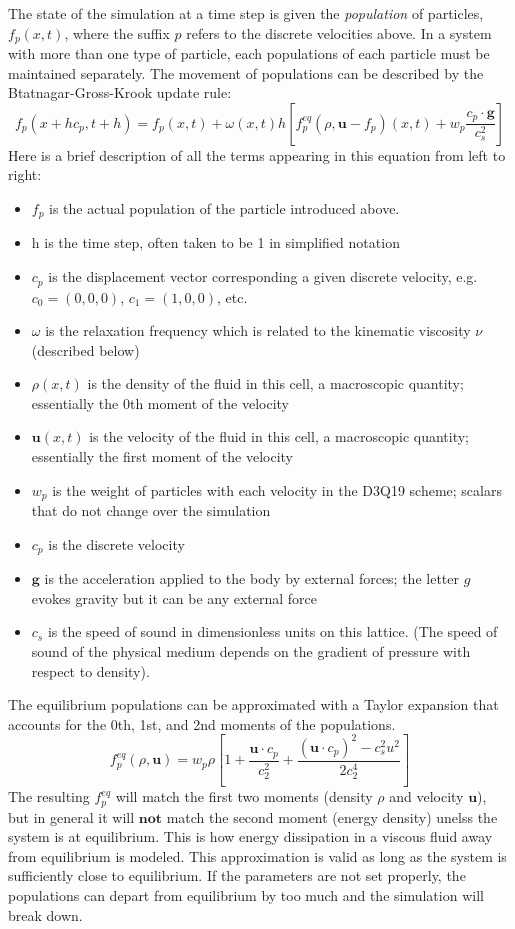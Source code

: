 \documentclass[11pt]{article} %
\renewcommand{\vec}[1]{\mathbf{#1}}
\begin{document}
The state of the simulation at a time step is given the \textit{population} of particles, 
$f_p(x,t)$, where the suffix $p$ refers to the discrete velocities above.
In a system with more than one type of particle, each populations of each particle must be maintained separately.  
The movement of populations can be described by the Btatnagar-Gross-Krook update rule:
$$f_p(x + hc_p, t + h) = f_p(x,t) + \omega(x,t) h \left[f_p^{eq}(\rho, \vec{u} - f_p)(x,t) + w_p \frac{c_p \cdot \vec{g}}{c_s^2} \right]$$
Here is a brief description of all the terms appearing in this equation from left to right:
\begin{itemize}
\item $f_p$ is the actual population of the particle introduced above.
\item h is the time step, often taken to be 1 in simplified notation
\item $c_p$ is the displacement vector corresponding a given discrete velocity, e.g. \\
$c_0 = (0,0,0)$,  $c_1 = (1,0,0)$, etc.
\item $\omega$ is the relaxation frequency which is related to the kinematic viscosity $\nu$ (described below)
\item $\rho(x,t)$ is the density of the fluid in this cell, a macroscopic quantity; essentially the 0th moment of the velocity
\item $\vec{u}(x,t)$ is the velocity of the fluid in this cell, a macroscopic quantity; essentially the first moment of the velocity
\item $w_p$ is the weight of particles with each velocity in the D3Q19 scheme; scalars that do not change over the simulation
\item $c_p$ is the discrete velocity
\item $\vec{g}$ is the acceleration applied to the body by external forces; the letter $g$ evokes gravity but it can be any external force
\item $c_s$ is the speed of sound in dimensionless units on this lattice. 
(The speed of sound of the physical medium depends on the gradient of pressure with respect to density).
\end{itemize}

The equilibrium populations can be approximated with a Taylor expansion that
accounts for the 0th, 1st, and 2nd moments of the populations.
$$f_p^{eq}(\rho, \vec{u}) = w_p \rho \left[1 + \frac{\vec{u} \cdot c_p}{c_2^2} + \frac{(\vec{u} \cdot c_p)^2 - c_s^2u^2}{2c_2^4} \right] $$
The resulting $f_p^{eq}$ will match the first two moments (density $\rho$ and velocity $\vec{u}$),
but in general it will $\textbf{not}$ match the second moment (energy density) unelss the system is at equilibrium.
This is how energy dissipation in a viscous fluid away from equilibrium is modeled.
This approximation is valid as long as the system is sufficiently close to equilibrium.
If the parameters are not set properly, the populations can depart from equilibrium by too much
and the simulation will break down.
\end{document}
